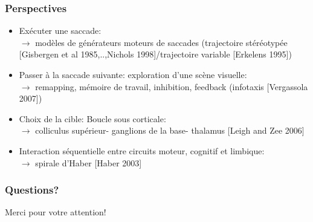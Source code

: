 \documentclass[10pt]{beamer}
\begin{document}
\begin{frame}
  \frametitle{Perspectives}
\begin{itemize}
\item Ex\'ecuter une saccade: \\{ {\color {blue} $\to$}} mod\`eles de {{\color {blue}g\'en\'erateurs moteurs de saccades}} (trajectoire st\'er\'eotyp\'ee [Gisbergen et al 1985,..,Nichols 1998]/trajectoire variable [Erkelens 1995])
\item Passer \`a la saccade suivante: {{\color {blue}exploration}} d'une sc\`ene visuelle:\\{\em {\color {blue} $\to$}} remapping, m\'emoire de travail, inhibition, feedback (infotaxis [Vergassola 2007])
\item Choix de la cible: Boucle sous corticale:\\{ {\color {blue} $\to$}} colliculus sup\'erieur- ganglions de la base- thalamus [Leigh and Zee 2006]
\item Interaction s\'equentielle entre circuits moteur, cognitif et limbique:\\
{\em {\color {blue} $\to$}} { \color {blue}spirale} d'Haber [Haber 2003] 
\end{itemize}
\end{frame}
\begin{frame}
  \frametitle{Questions?}
\begin{center}Merci pour votre attention!\end{center}
\end{frame}
\end{document}
